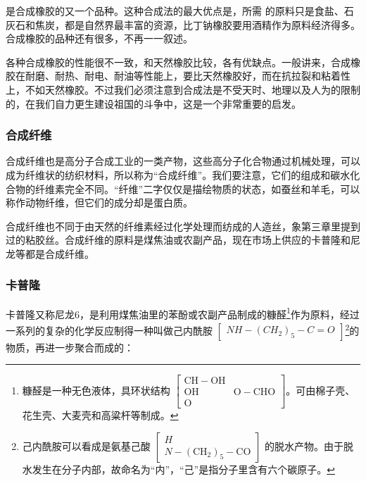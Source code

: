 是合成橡胶的又一个品种。这种合成法的最大优点是，所需
的原料只是食盐、石灰石和焦炭，都是自然界最丰富的资源，比丁钠橡胶要用酒精作为原料经济得多。合成橡胶的品种还有很多，不再一一叙述。

各种合成橡胶的性能很不一致，和天然橡胶比较，各有优缺点。一般讲来，合成橡胶在耐磨、耐热、耐电、耐油等性能上，要比天然橡胶好，而在抗拉裂和粘着性上，不如天然橡胶。不过我们必须注意到合成法是不受天时、地理以及人为的限制的，在我们自力更生建设祖国的斗争中，这是一个非常重要的启发。

\subsubsection{合成纤维}

合成纤维也是高分子合成工业的一类产物，这些高分子化合物通过机械处理，可以成为纤维状的纺织材料，所以称为``合成纤维''。我们要注意，它们的组成和碳水化合物的纤维素完全不同。``纤维''二字仅仅是描绘物质的状态，如蚕丝和羊毛，可以称作动物纤维，但它们的成分却是蛋白质。

合成纤维也不同于由天然的纤维素经过化学处理而纺成的人造丝，象第三章里提到过的粘胶丝。合成纤维的原料是煤焦油或农副产品，现在市场上供应的卡普隆和尼龙等都是合成纤维。

\subsubsection{卡普隆}

卡普隆又称尼龙6，是利用煤焦油里的苯酚或农副产品制成的糠醛\footnote{糠醛是一种无色液体，具环状结构
  \(\left[ \begin{array}{cc} \mathrm{CH}-\mathrm{OH} & \\ \mathrm{OH} & \mathrm{O}-\mathrm{CHO} \\ \mathrm{O} & \end{array} \right]\)。可由棉子壳、花生壳、大麦壳和高粱杆等制成。}作为原料，经过一系列的复杂的化学反应制得一种叫做己内酰胺
\(\left[\begin{array}{c}NH-(CH_{2})_{5}-C=O\end{array}\right]\)\footnote{己内酰胺可以看成是氨基己酸
  \(\left[\begin{array}{c}H\\N-(\mathrm{CH}_{2})_{5}-\mathrm{CO}\end{array}\right]\)
  的脱水产物。由于脱水发生在分子内部，故命名为``内''，``己''是指分子里含有六个碳原子。}的物质，再进一步聚合而成的：


